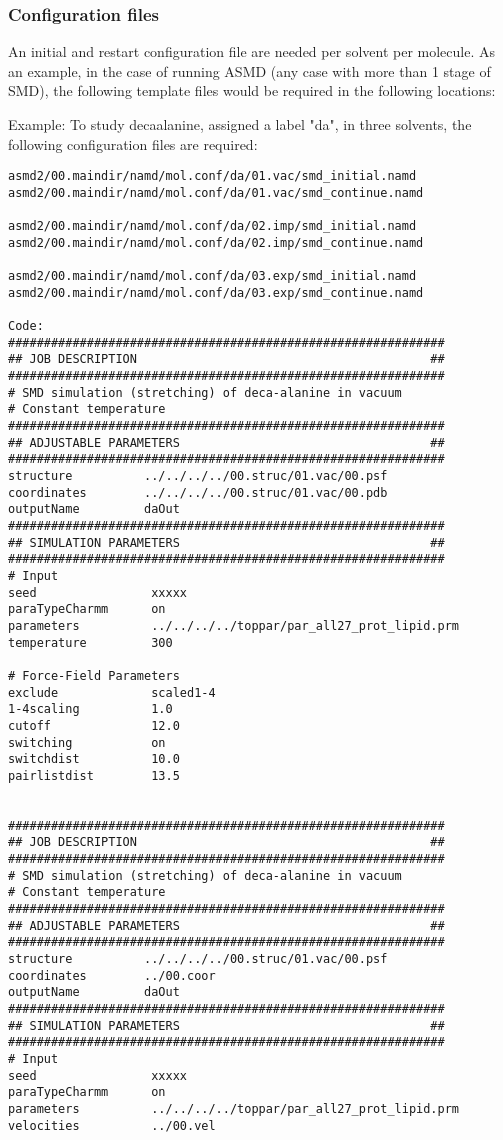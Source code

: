 \documentclass[11pt]{article}
\begin{document}
\subsubsection{Configuration files}
An initial and restart configuration file are needed per solvent per molecule.
As an example, in the case of running ASMD (any case with more than 1 stage of SMD), the following template files would be required in the following locations:

Example: To study decaalanine, assigned a label "da", in three solvents, the following configuration files are required:

\begin{verbatim}
asmd2/00.maindir/namd/mol.conf/da/01.vac/smd_initial.namd
asmd2/00.maindir/namd/mol.conf/da/01.vac/smd_continue.namd

asmd2/00.maindir/namd/mol.conf/da/02.imp/smd_initial.namd
asmd2/00.maindir/namd/mol.conf/da/02.imp/smd_continue.namd

asmd2/00.maindir/namd/mol.conf/da/03.exp/smd_initial.namd
asmd2/00.maindir/namd/mol.conf/da/03.exp/smd_continue.namd

Code:
#############################################################
## JOB DESCRIPTION                                         ##
#############################################################
# SMD simulation (stretching) of deca-alanine in vacuum
# Constant temperature
#############################################################
## ADJUSTABLE PARAMETERS                                   ##
#############################################################
structure          ../../../../00.struc/01.vac/00.psf
coordinates        ../../../../00.struc/01.vac/00.pdb
outputName         daOut
#############################################################
## SIMULATION PARAMETERS                                   ##
#############################################################
# Input
seed                xxxxx
paraTypeCharmm	    on
parameters          ../../../../toppar/par_all27_prot_lipid.prm
temperature         300
 
# Force-Field Parameters
exclude             scaled1-4
1-4scaling          1.0
cutoff              12.0
switching           on
switchdist          10.0
pairlistdist        13.5


#############################################################
## JOB DESCRIPTION                                         ##
#############################################################
# SMD simulation (stretching) of deca-alanine in vacuum
# Constant temperature
#############################################################
## ADJUSTABLE PARAMETERS                                   ##
#############################################################
structure          ../../../../00.struc/01.vac/00.psf
coordinates        ../00.coor
outputName         daOut
#############################################################
## SIMULATION PARAMETERS                                   ##
#############################################################
# Input
seed                xxxxx
paraTypeCharmm	    on
parameters          ../../../../toppar/par_all27_prot_lipid.prm
velocities          ../00.vel
 

\end{verbatim}
\end{document}
